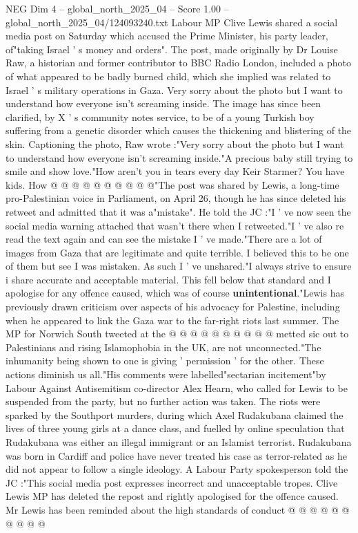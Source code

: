 \begin{textsample}{NEG Dim 4 – global\_north\_2025\_04 – Score 1.00 – global\_north\_2025\_04/124093240.txt}  \label{ex:f4_neg_237}
Labour MP Clive Lewis shared a social media post on Saturday which accused the Prime Minister, his party leader, of"taking Israel ' s money and orders".
The post, made originally by Dr Louise Raw, a historian and former contributor to BBC Radio London, included a photo of what appeared to be badly burned child, which she implied was related to Israel ' s military operations in Gaza.
Very sorry about the photo but I want to understand how everyone isn't screaming inside.
The image has since been clarified, by X ' s community notes service, to be of a young Turkish boy suffering from a genetic disorder which causes the thickening and blistering of the skin.
Captioning the photo, Raw wrote :"Very sorry about the photo but I want to understand how everyone isn't screaming inside."A precious baby still trying to smile and show love."How aren't you in tears every day Keir Starmer?
You have kids.
How @ @ @ @ @ @ @ @ @ @"The post was shared by Lewis, a long-time pro-Palestinian voice in Parliament, on April 26, though he has since deleted his retweet and admitted that it was a"mistake".
He told the JC :"I ' ve now seen the social media warning attached that wasn't there when I retweeted."I ' ve also re read the text again and can see the mistake I ' ve made."There are a lot of images from Gaza that are legitimate and quite terrible.
I believed this to be one of them but see I was mistaken.
As such I ' ve unshared."I always strive to ensure i share accurate and acceptable material.
This fell below that standard and I apologise for any offence caused, which was of course \textbf{unintentional}."Lewis has previously drawn criticism over aspects of his advocacy for Palestine, including when he appeared to link the Gaza war to the far-right riots last summer.
The MP for Norwich South tweeted at the @ @ @ @ @ @ @ @ @ @ metted sic out to Palestinians and rising Islamophobia in the UK, are not unconnected."The inhumanity being shown to one is giving ' permission ' for the other.
These actions diminish us all."His comments were labelled"sectarian incitement"by Labour Against Antisemitism co-director Alex Hearn, who called for Lewis to be suspended from the party, but no further action was taken.
The riots were sparked by the Southport murders, during which Axel Rudakubana claimed the lives of three young girls at a dance class, and fuelled by online speculation that Rudakubana was either an illegal immigrant or an Islamist terrorist.
Rudakubana was born in Cardiff and police have never treated his case as terror-related as he did not appear to follow a single ideology.
A Labour Party spokesperson told the JC :"This social media post expresses incorrect and unacceptable tropes.
Clive Lewis MP has deleted the repost and rightly apologised for the offence caused.
Mr Lewis has been reminded about the high standards of conduct @ @ @ @ @ @ @ @ @ @

\end{textsample}
